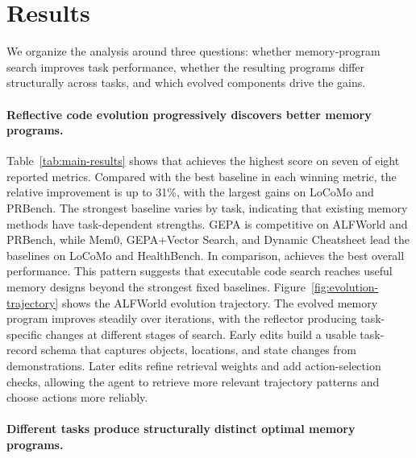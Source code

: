 



\section{Results}
\label{sec:results}

We organize the analysis around three questions: whether memory-program search improves task performance, whether the resulting programs differ structurally across tasks, and which evolved components drive the gains.

\paragraph{Reflective code evolution progressively discovers better memory programs.}
Table~\ref{tab:main-results} shows that \sysname{} achieves the highest score on seven of eight reported metrics.
Compared with the best baseline in each winning metric, the relative improvement is up to 31\%, with the largest gains on LoCoMo and PRBench.
The strongest baseline varies by task, indicating that existing memory methods have task-dependent strengths.
GEPA is competitive on ALFWorld and PRBench, while Mem0, GEPA+Vector Search, and Dynamic Cheatsheet lead the baselines on LoCoMo and HealthBench.
In comparison, \sysname{} achieves the best overall performance.
This pattern suggests that executable code search reaches useful memory designs beyond the strongest fixed baselines.
Figure~\ref{fig:evolution-trajectory} shows the ALFWorld evolution trajectory.
The evolved memory program improves steadily over iterations, with the reflector producing task-specific changes at different stages of search.
Early edits build a usable task-record schema that captures objects, locations, and state changes from demonstrations.
Later edits refine retrieval weights and add action-selection checks, allowing the agent to retrieve more relevant trajectory patterns and choose actions more reliably.

\paragraph{Different tasks produce structurally distinct optimal memory programs.}





